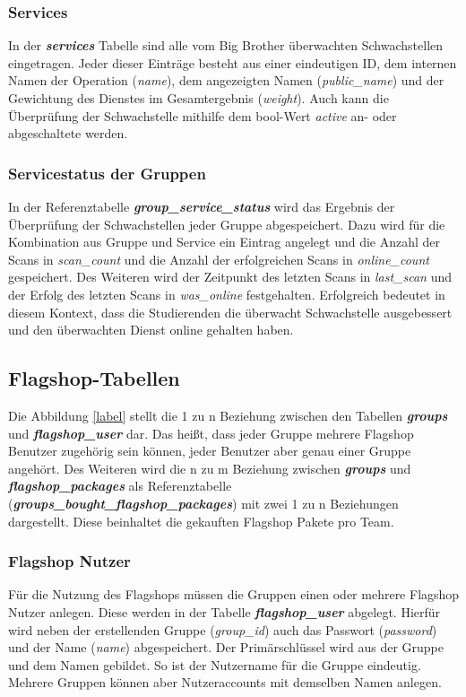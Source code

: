 \subsubsection{Services}
In der \textbf{\textit{services}} Tabelle sind alle vom Big Brother überwachten Schwachstellen eingetragen. Jeder dieser Einträge besteht aus einer eindeutigen ID, dem internen Namen der Operation (\textit{name}), dem angezeigten Namen (\textit{public\_name}) und der Gewichtung des Dienstes im Gesamtergebnis (\textit{weight}). Auch kann die Überprüfung der Schwachstelle mithilfe dem bool-Wert \textit{active} an- oder abgeschaltete werden.

\subsubsection{Servicestatus der Gruppen}
In der Referenztabelle \textbf{\textit{group\_service\_status}} wird das Ergebnis der Überprüfung der Schwachstellen jeder Gruppe abgespeichert. Dazu wird für die Kombination aus Gruppe und Service ein Eintrag angelegt und die Anzahl der Scans in \textit{scan\_count} und die Anzahl der erfolgreichen Scans in \textit{online\_count} gespeichert. Des Weiteren wird der Zeitpunkt des letzten Scans in \textit{last\_scan} und der Erfolg des letzten Scans in \textit{was\_online} festgehalten. Erfolgreich bedeutet in diesem Kontext, dass die Studierenden die überwacht Schwachstelle ausgebessert und den überwachten Dienst online gehalten haben.

\subsection{Flagshop-Tabellen}
Die Abbildung \ref{label} stellt die 1 zu n Beziehung zwischen den Tabellen \textbf{\textit{groups}} und \textbf{\textit{flagshop\_user}} dar. Das heißt, dass jeder Gruppe mehrere Flagshop Benutzer zugehörig sein können, jeder Benutzer aber genau einer Gruppe angehört. Des Weiteren wird die n zu m Beziehung zwischen \textbf{\textit{groups}} und \textbf{\textit{flagshop\_packages}} als Referenztabelle (\textbf{\textit{groups\_bought\_flagshop\_packages}}) mit zwei 1 zu n Beziehungen dargestellt. Diese beinhaltet die gekauften Flagshop Pakete pro Team.

\subsubsection{Flagshop Nutzer}
Für die Nutzung des Flagshops müssen die Gruppen einen oder mehrere Flagshop Nutzer anlegen. Diese werden in der Tabelle \textbf{\textit{flagshop\_user}} abgelegt. Hierfür wird neben der erstellenden Gruppe (\textit{group\_id}) auch das Passwort (\textit{password}) und der Name (\textit{name})  abgespeichert. Der Primärschlüssel wird aus der Gruppe und dem Namen gebildet. So ist der Nutzername für die Gruppe eindeutig. Mehrere Gruppen können aber Nutzeraccounts mit demselben Namen anlegen.

